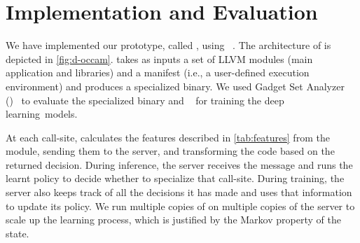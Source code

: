 \section{Implementation and Evaluation}

We have implemented our prototype, called \doccam,
using \occam~\cite{occam}. The architecture of \doccam is depicted in
\cref{fig:d-occam}.
%
\doccam takes as inputs a set of LLVM modules (main application and
libraries) and a manifest (i.e., a user-defined execution environment)
and produces a specialized binary.
%
We used Gadget Set Analyzer (\gsa)~\cite{gsa} to evaluate 
 the specialized binary and
\pytorch~\cite{pytorch} for training the deep learning~models. %
 
At each call-site, \occam calculates the features
described in \cref{tab:features} from the \llvm module, sending them to the \pytorch server, and
transforming the code based on the returned decision.
%
During inference, the \pytorch server receives the message and runs the learnt
policy to decide whether to specialize that
call-site. During training, the \pytorch server also keeps track of all the
decisions it has made and uses that information to update its
policy. We run multiple copies of \occam on multiple copies of the \pytorch
server to scale up the learning process, which is justified by the Markov property of the state.%




